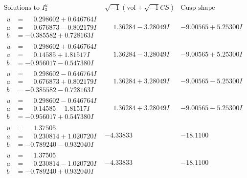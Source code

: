 \documentclass[1p]{elsarticle_modified}
\theoremstyle{definition}
\newcommand{\I}{\sqrt{-1}}
\begin{document}
$$\begin{array}{c|c|c}  
\text{Solutions to }I^u_{3}& \I (\text{vol} + \sqrt{-1}CS) & \text{Cusp shape}\\
 \hline 
\begin{aligned}
u &= \phantom{-}0.298602 + 0.646764 I \\
a &= \phantom{-}0.676873 - 0.802179 I \\
b &= -0.385582 + 0.728163 I\end{aligned}
 & \phantom{-}1.36284 - 3.28049 I & -9.00565 + 5.25300 I \\ \hline\begin{aligned}
u &= \phantom{-}0.298602 + 0.646764 I \\
a &= \phantom{-}0.14585 + 1.81517 I \\
b &= -0.956017 - 0.547380 I\end{aligned}
 & \phantom{-}1.36284 - 3.28049 I & -9.00565 + 5.25300 I \\ \hline\begin{aligned}
u &= \phantom{-}0.298602 - 0.646764 I \\
a &= \phantom{-}0.676873 + 0.802179 I \\
b &= -0.385582 - 0.728163 I\end{aligned}
 & \phantom{-}1.36284 + 3.28049 I & -9.00565 - 5.25300 I \\ \hline\begin{aligned}
u &= \phantom{-}0.298602 - 0.646764 I \\
a &= \phantom{-}0.14585 - 1.81517 I \\
b &= -0.956017 + 0.547380 I\end{aligned}
 & \phantom{-}1.36284 + 3.28049 I & -9.00565 - 5.25300 I \\ \hline\begin{aligned}
u &= \phantom{-}1.37505\phantom{ +0.000000I} \\
a &= \phantom{-}0.230814 + 1.020720 I \\
b &= -0.789240 - 0.932040 I\end{aligned}
 & -4.33833\phantom{ +0.000000I} & -18.1100\phantom{ +0.000000I} \\ \hline\begin{aligned}
u &= \phantom{-}1.37505\phantom{ +0.000000I} \\
a &= \phantom{-}0.230814 - 1.020720 I \\
b &= -0.789240 + 0.932040 I\end{aligned}
 & -4.33833\phantom{ +0.000000I} & -18.1100\phantom{ +0.000000I} \\ \hline\begin{aligned}

\end{aligned}
\end{array}$$
\end{document}
